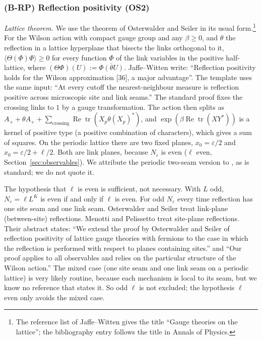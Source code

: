 \subsubsection{(B-RP) Reflection positivity (OS2)}\label{sec:BRP}
\emph{Lattice theorem.} We use the theorem of Osterwalder and Seiler \cite{osterwalderseiler1978} in its usual form.\footnote{\label{corr:title}The reference list of Jaffe--Witten gives the title ``Gauge theories on the lattice''; the bibliography entry follows the title in Annals of Physics.} For the Wilson action with compact gauge group and any $\beta\ge0$, and $\theta$ the reflection in a lattice hyperplane that bisects the links orthogonal to it, $\langle\Theta(\Phi)\Phi\rangle\ge0$ for every function $\Phi$ of the link variables in the positive half-lattice, where $(\Theta\Phi)(U):=\overline{\Phi(\theta U)}$. Jaffe--Witten \cite{jaffewitten} write: ``Reflection positivity holds for the Wilson approximation [36], a major advantage''. The template \cite{OAI26-O3} uses the same input: ``At every cutoff the nearest-neighbour measure is reflection positive across microscopic site and link seams.'' The standard proof fixes the crossing links to $1$ by a gauge transformation. The action then splits as $A_++\theta A_++\sum_{\text{crossing}}\operatorname{Re}\operatorname{tr}(X_p\theta(X_p)^*)$, and $\exp(\beta\operatorname{Re}\operatorname{tr}(XY^*))$ is a kernel of positive type (a positive combination of characters), which gives a sum of squares. On the periodic lattice there are two fixed planes, $x_0=\varepsilon/2$ and $x_0=\varepsilon/2+\ell/2$. Both are link planes, because $N_\varepsilon$ is even ($\ell$ even, Section~\ref{sec:observables}). We attribute the periodic two-seam version to \cite{osterwalderseiler1978}, as is standard; we do not quote it.

\begin{remark}\label{corr:ell}\label{sec:corrections}
The hypothesis that $\ell$ is even is sufficient, not necessary. With $L$ odd, $N_\varepsilon=\ell L^K$ is even if and only if $\ell$ is even. For odd $N_\varepsilon$ every time reflection has one site seam and one link seam. Osterwalder and Seiler \cite{osterwalderseiler1978} treat link-plane (between-site) reflections. Menotti and Pelissetto \cite{menottipelissetto1987} treat site-plane reflections. Their abstract states: ``We extend the proof by Osterwalder and Seiler of reflection positivity of lattice gauge theories with fermions to the case in which the reflection is performed with respect to planes containing sites.'' and ``Our proof applies to all observables and relies on the particular structure of the Wilson action.'' The mixed case (one site seam and one link seam on a periodic lattice) is very likely routine, because each mechanism is local to its seam, but we know no reference that states it. So odd $\ell$ is not excluded; the hypothesis $\ell$ even only avoids the mixed case.
\end{remark}


